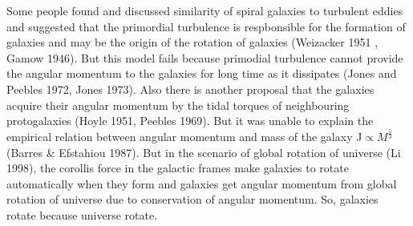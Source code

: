 %
%
%
%
Some people found and discussed similarity of spiral galaxies to turbulent eddies and suggested that the primordial turbulence is respbonsible for the formation of galaxies and may be the origin of the rotation of galaxies (Weizacker 1951 , Gamow 1946). But this model fails because primodial turbulence cannot provide the angular momentum to the galaxies for long time as it dissipates (Jones and Peebles 1972, Jones 1973). Also there is another proposal that the galaxies acquire their angular momentum by the tidal torques of neighbouring protogalaxies (Hoyle 1951, Peebles 1969). But it was unable to explain the empirical relation between angular momentum and mass of the galaxy J$\propto M^{\frac{5}{3}}$ (Barres \& Efstahiou 1987). But in the scenario of global rotation of universe (Li 1998), the corollis force in the galactic frames make galaxies to rotate automatically when they form and galaxies get angular momentum from global rotation of universe due to conservation of angular momentum. So, galaxies rotate because universe rotate.
